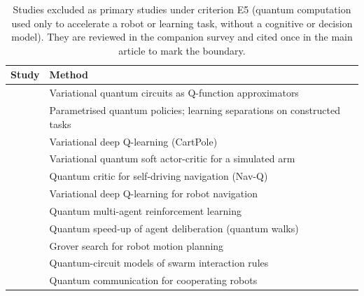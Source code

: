 \documentclass[10pt,a4paper]{article}
\begin{document}
\begin{longtable}{@{}P{4.6cm}P{11.7cm}@{}}
\caption{Studies excluded as primary studies under criterion E5 (quantum computation used only to accelerate a robot or learning task, without a cognitive or decision model). They are reviewed in the companion survey \citep{Guru2026} and cited once in the main article to mark the boundary.}\label{tab:S7}\\
\toprule \textbf{Study} & \textbf{Method} \\ \midrule \endfirsthead
\bottomrule \endfoot

\citet{Chen2020} & Variational quantum circuits as Q-function approximators \\
\citet{Jerbi2021} & Parametrised quantum policies; learning separations on constructed tasks \\
\citet{Skolik2022} & Variational deep Q-learning (CartPole) \\
\citet{Acuto2022} & Variational quantum soft actor-critic for a simulated arm \\
\citet{Sinha2023} & Quantum critic for self-driving navigation (Nav-Q) \\
\citet{Hohenfeld2024} & Variational deep Q-learning for robot navigation \\
\citet{Yun2022} & Quantum multi-agent reinforcement learning \\
\citet{Paparo2014} & Quantum speed-up of agent deliberation (quantum walks) \\
\citet{Chella2022} & Grover search for robot motion planning \\
\citet{Mannone2022} & Quantum-circuit models of swarm interaction rules \\
\citet{Khoshnoud2020} & Quantum communication for cooperating robots \\
\end{longtable}
\end{document}
